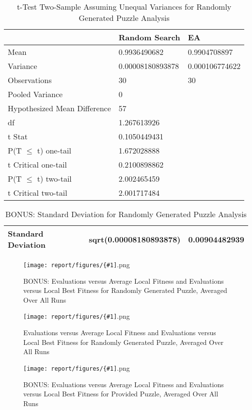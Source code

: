 \documentclass[11pt]{article}
\newcommand{\addgraphic}[1]{\centerline{\texttt{[image: report/figures/\{\#1]}.png}}}
\begin{document}
\begin{table}[]
\centering
\caption{t-Test Two-Sample Assuming Unequal Variances for Randomly Generated Puzzle Analysis}
\label{my-label}
\begin{tabular}{l|l|l}
 & Random Search & EA \\ \hline
Mean & 0.9936490682 & 0.9904708897 \\
Variance & 0.00008180893878 & 0.000106774622 \\
Observations & 30 & 30 \\
Pooled Variance & 0 &  \\
Hypothesized Mean Difference & 57 &  \\
df & 1.267613926 &  \\
t Stat & 0.1050449431 &  \\
P(T $\leq$ t) one-tail & 1.672028888 &  \\
t Critical one-tail & 0.2100898862 &  \\
P(T $\leq$ t) two-tail & 2.002465459 &  \\
t Critical two-tail & 2.001717484 & 
\end{tabular}
\end{table}


\begin{table}[]
\centering
\caption{BONUS: Standard Deviation for Randomly Generated Puzzle Analysis}
\label{my-label}
\begin{tabular}{|l|l|l|}
\hline
Standard Deviation & sqrt(0.00008180893878) & 0.00904482939 \\ \hline
\end{tabular}
\end{table}





\begin{figure}
    \addgraphic{random_gen_log_BONUS_graph}
    \caption{BONUS: Evaluations versus Average Local Fitness and Evaluations versus Local Best Fitness for Randomly Generated Puzzle, Averaged Over All Runs}
    \label{fig:std_rand_bonus}
\end{figure}

\begin{figure}
    \addgraphic{random_gen_log_graph}
    \caption{Evaluations versus Average Local Fitness and Evaluations versus 
Local Best Fitness for Randomly Generated Puzzle, Averaged Over All Runs}
    \label{fig:std_rand_norm}
\end{figure}

\begin{figure}
    \addgraphic{website_puzzle_log_BONUS_graph}
    \caption{BONUS: Evaluations versus Average Local Fitness and Evaluations versus Local Best Fitness for Provided Puzzle, Averaged Over All Runs}
    \label{fig:std_web_bonus}
\end{figure}
\end{document}
